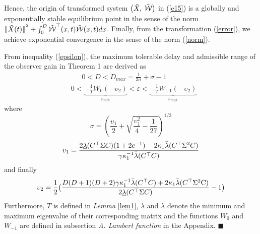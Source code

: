 \documentclass[12pt,draftcls,onecolumn]{IEEEtran}
\newcommand{\carre} {\hfill $\blacksquare$}
\begin{document}
Hence, the origin of transformed system $\left( {\tilde X,\;\tilde {\cal W}} \right) $ in (\ref{e15}) is a globally and exponentially stable equilibrium point in the sense of the norm $ { {{{\| {\tilde X(t)} \|}^2} + \int_0^D {{{\tilde {\cal W}}^{\top} }(x,t)\tilde {\cal W}(x,t)dx} } } $. Finally, from the transformation (\ref{error}), we achieve exponential convergence in the sense of the norm (\ref{norm}).

From inequality (\ref{epsilon}), the maximum tolerable delay and admissible range of the observer gain in Theorem 1 are derived as
\begin{equation}\label{eq:Dmax}
\begin{aligned}
&~~~~~~~0<D<D_{max}=\frac{1}{{3\sigma }} + \sigma  - 1 \\
&0 <  \underbrace{- \frac{1}{T}{W_0}( - {\upsilon _2})}_{\varepsilon_{min}} < \varepsilon  <\underbrace{- \frac{1}{T}{W_{ - 1}}( - {\upsilon _2})}_{\varepsilon_{max}}
\end{aligned}
\end{equation}
where $$ \sigma  = {\left( {\frac{{{\upsilon _1}}}{2} + \sqrt {\frac{{\upsilon _1^2}}{4} - \frac{1}{{27}}} } \right)^{1/3}} $$ $${\upsilon _1} = \frac{{2\underline\lambda ({C^{\top} }{\rm{\Sigma }}C)(1 + 2{e^{ - 1}}) - 2{\kappa _1} \bar \lambda ({C^{\top} }{{\rm{\Sigma }}^2}C)}}{{\gamma \kappa _1^{ - 1}\bar\lambda ({C^{\top} }C)}}$$
and finally
$${\upsilon _2} = \frac{1}{2}\big( {\frac{{D(D + 1)(D + 2)\gamma \kappa _1^{ - 1}\bar\lambda ({C^{\top} }C) + 2{\kappa _1}\bar\lambda ({C^{\top} }{{\rm{\Sigma }}^2}{\rm{C}})}}{{2\underline\lambda ({C^{\top} }{\rm{\Sigma }}C)}} - 1} \big)$$
Furthermore,  $T$ is defined in {\it{Lemma}} \ref{lem1}, $ \underline\lambda $ and $ \bar\lambda $ denote the minimum and maximum eigenvalue of their corresponding matrix and the functions ${W_0}$ and ${W_{ - 1}}$ are defined in subsection \textit{A. Lambert function} in the Appendix. \carre
\end{document}
